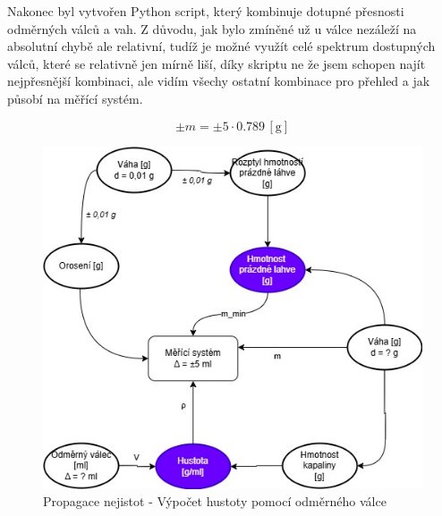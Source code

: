 Nakonec byl vytvořen Python script, který kombinuje dotupné přesnosti odměrných válců a vah. Z důvodu, jak bylo zmíněné už u válce nezáleží na absolutní chybě ale relativní, tudíž je možné využít celé spektrum dostupných válců, které se relativně jen mírně liší, díky skriptu ne že jsem schopen najít nejpřesnější kombinaci, ale vidím všechy ostatní kombinace pro přehled a jak působí na měřící systém.

\begin{equation}
    \pm m = \pm 5 \cdot 0.789 \, \left[\mathrm{g}\right] \label{objem_kapalina}
\end{equation}





\begin{figure}[H]
    \begin{center}
        \includegraphics[scale=0.6]{obrazky/Propagace nejistot-Metoda 2+.jpg}
    \end{center}
    \caption{Propagace nejistot - Výpočet hustoty pomocí odměrného válce}
\end{figure}

